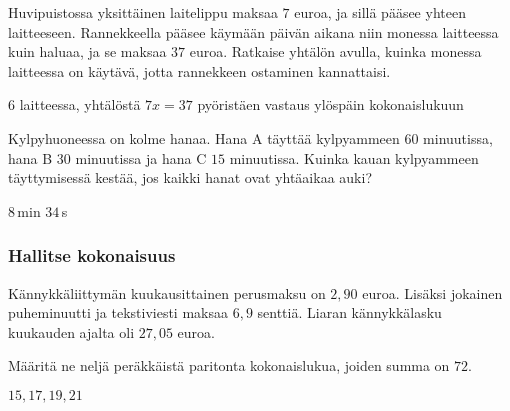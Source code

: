 \begin{tehtavasivu}
\begin{tehtava}
Huvipuistossa yksittäinen laitelippu maksaa $7$ euroa, ja sillä pääsee yhteen laitteeseen. Rannekkeella pääsee käymään päivän aikana niin monessa laitteessa kuin haluaa, ja se maksaa $37$ euroa. Ratkaise yhtälön avulla, kuinka monessa laitteessa on käytävä, jotta rannekkeen ostaminen kannattaisi.
	\begin{vastaus}
$6$ laitteessa, yhtälöstä $7x=37$ pyöristäen vastaus ylöspäin kokonaislukuun
	\end{vastaus}
\end{tehtava}

\begin{tehtava} %
Kylpyhuoneessa on kolme hanaa. Hana A täyttää kylpyammeen $60$ minuutissa, hana B $30$ minuutissa ja hana C $15$ minuutissa. Kuinka kauan kylpyammeen täyttymisessä kestää, jos kaikki hanat ovat yhtäaikaa auki?
	\begin{vastaus}
$8$\,min $34$\,s
	\end{vastaus}
\end{tehtava}

\subsubsection*{Hallitse kokonaisuus}

\begin{tehtava}
Kännykkäliittymän kuukausittainen perusmaksu on $2,90$ euroa. Lisäksi jokainen puheminuutti ja tekstiviesti maksaa $6,9$ senttiä. Liaran kännykkälasku kuukauden ajalta oli $27,05$ euroa.
	\begin{vastaus}
	\end{vastaus}
\end{tehtava}

\begin{tehtava}
Määritä ne neljä peräkkäistä paritonta kokonaislukua, joiden summa on $72$.
	\begin{vastaus}
	 $15, 17, 19, 21$
	\end{vastaus}
\end{tehtava}


\end{tehtavasivu}
